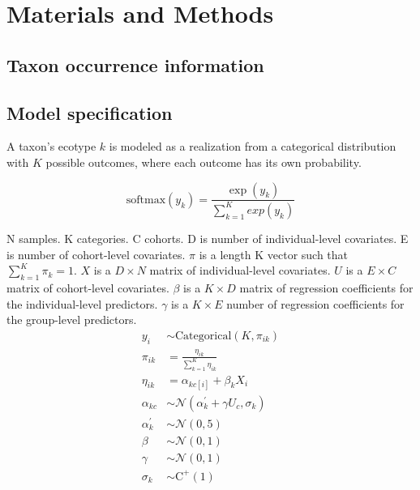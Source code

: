 \documentclass[12pt,letterpaper]{article}
\begin{document}
\section{Materials and Methods}

\subsection{Taxon occurrence information}


\subsection{Model specification}

A taxon's ecotype \(k\) is modeled as a realization from a categorical distribution with \(K\) possible outcomes, where each outcome has its own probability.


\begin{equation}
  \mathrm{softmax}(y_k) = \frac{\exp(y_k)}{\sum_{k = 1}^{K} exp(y_{k})}
  \label{eq:softmax}
\end{equation}

N samples. K categories. C cohorts. D is number of individual-level covariates. E is number of cohort-level covariates.  \(\pi\) is a length K vector such that \(\sum_{k = 1}^{K} \pi_{k} = 1\). \(X\) is a \(D \times N\) matrix of individual-level covariates. \(U\) is a \(E \times C\) matrix of cohort-level covariates. \(\beta\) is a \(K \times D\) matrix of regression coefficients for the individual-level predictors. \(\gamma\) is a \(K \times E\) number of regression coefficients for the group-level predictors.
\begin{equation}
  \begin{aligned}
    y_{i} &\sim \mathrm{Categorical}(K, \pi_{ik}) \\
    \pi_{ik} &= \frac{\eta_{ik}}{\sum_{k = 1}^{K} \eta_{ik}} \\
    \eta_{ik} &= \alpha_{kc[i]} + \beta_{k}X_{i} \\
    \alpha_{kc} &\sim \mathcal{N}(\alpha_{k}^{\prime} + \gamma U_{c}, \sigma_{k}) \\
    \alpha_{k}^{\prime} &\sim \mathcal{N}(0, 5) \\
    \beta &\sim \mathcal{N}(0, 1) \\
    \gamma &\sim \mathcal{N}(0, 1) \\
    \sigma_{k} &\sim \mathrm{C}^{+}(1) \\
  \end{aligned}
  \label{eq:main}
\end{equation}
\end{document}
